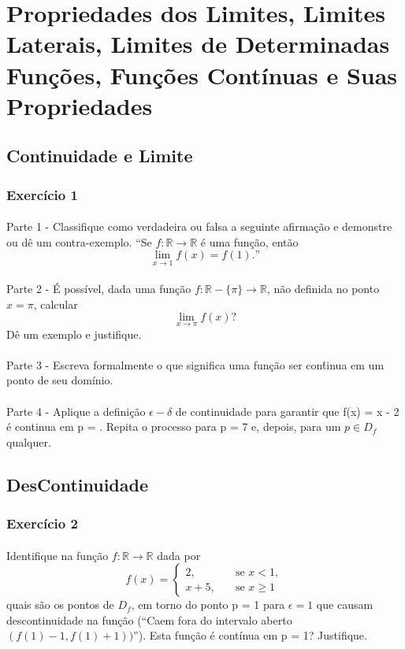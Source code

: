 \documentclass{article}
\begin{document}
\newpage

\section{Propriedades dos Limites, Limites Laterais, Limites de Determinadas Fun\c c\~oes, Fun\c c\~oes Cont\'inuas e Suas Propriedades}
\subsection{Continuidade e Limite}
\subsubsection{Exerc\'icio 1}
\paragraph{} Parte 1 - Classifique como verdadeira ou falsa a seguinte afirma\c c\~ao e demonstre ou d\^e um contra-exemplo.
``Se $f: \mathbb{R}\rightarrow\mathbb{R}$ \'e uma fun\c c\~ao, ent\~ao
$$
\lim_{x\to{1}}f(x) = f(1).\text{''}
$$
\paragraph{} Parte 2 - \'E poss\'ivel, dada uma fun\c c\~ao $f:\mathbb{R}-\{\pi\}\rightarrow \mathbb{R}$, n\~ao definida no ponto $x=\pi$, calcular 
$$
\lim_{x\to\pi}f(x)?
$$
D\^e um exemplo e justifique.
\paragraph{} Parte 3 - Escreva formalmente o que significa uma fun\c c\~ao ser con\'tinua em um ponto de seu dom\'inio.
\paragraph{} Parte 4 - Aplique a defini\c c\~ao $\epsilon-\delta$ de continuidade para garantir que f(x) = x - 2 \'e continua em p = . Repita o processo para p = 7 e, depois, para um $p\in{D_f}$ qualquer.
\subsection{DesContinuidade}
\subsubsection{Exerc\'icio 2}
\paragraph{} Identifique na fun\c c\~ao $f:\mathbb{R}\rightarrow\mathbb{R}$ dada por 
$$
f(x) = \left\{\begin{array}{ll}
		2, & \quad \text{se } x < 1,\\
		x + 5, & \quad \text{se } x\geq 1
\end{array}\right.
$$
quais s\~ao os pontos de $D_f$, em torno do ponto p = 1 para $\epsilon = 1$ que causam descontinuidade na fun\c c\~ao (``Caem fora do intervalo aberto $(f(1) - 1, f(1)+ 1))$''). Esta fun\c c\~ao \'e cont\'inua em p = 1? Justifique. 
\end{document}
